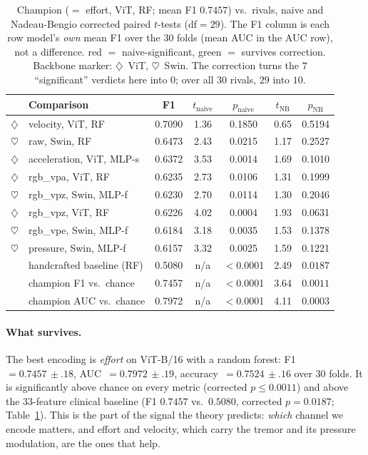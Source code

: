 \documentclass{article}
\newcommand{\gcell}{\cellcolor{goodbg}}
\newcommand{\rcell}{\cellcolor{badbg}}
\newcommand{\img}{\textcolor{vitc}{$\diamondsuit$}} %
\newcommand{\seq}{\textcolor{swinc}{$\heartsuit$}}  %
\begin{document}
\begin{table}[t]
\caption{Champion ($=$ effort, ViT, RF; mean F1 $\mathbf{0.7457}$) vs.\ rivals, naive
and Nadeau-Bengio corrected paired $t$-tests (df$=29$). The F1 column is each row
model's \emph{own} mean F1 over the $30$ folds (mean AUC in the AUC row), not a
difference. \rcell{}red $=$ naive-significant, \gcell{}green $=$ survives correction.
Backbone marker: \img~ViT, \seq~Swin. The correction turns the $7$ ``significant''
verdicts here into $0$; over all $30$ rivals, $29$ into $10$.}
\label{tab:sig}
\centering
\small
\setlength{\tabcolsep}{5.5pt}
\renewcommand{\arraystretch}{1.1}
\begin{tabular}{@{}clccccc@{}}
\toprule
 & Comparison & F1 & $t_{\text{naive}}$ & $p_{\text{naive}}$ & $t_{\text{NB}}$ & $p_{\text{NB}}$ \\
\midrule
\img & velocity, ViT, RF        & 0.7090 & 1.36 & 0.1850 & 0.65 & 0.5194 \\
\seq & raw, Swin, RF            & 0.6473 & 2.43 & \rcell 0.0215 & 1.17 & 0.2527 \\
\img & acceleration, ViT, MLP-s & 0.6372 & 3.53 & \rcell 0.0014 & 1.69 & 0.1010 \\
\img & rgb\_vpa, ViT, RF        & 0.6235 & 2.73 & \rcell 0.0106 & 1.31 & 0.1999 \\
\seq & rgb\_vpz, Swin, MLP-f    & 0.6230 & 2.70 & \rcell 0.0114 & 1.30 & 0.2046 \\
\img & rgb\_vpz, ViT, RF        & 0.6226 & 4.02 & \rcell 0.0004 & 1.93 & 0.0631 \\
\seq & rgb\_vpe, Swin, MLP-f    & 0.6184 & 3.18 & \rcell 0.0035 & 1.53 & 0.1378 \\
\seq & pressure, Swin, MLP-f    & 0.6157 & 3.32 & \rcell 0.0025 & 1.59 & 0.1221 \\
\midrule
     & handcrafted baseline (RF) & 0.5080 & n/a & $<$0.0001 & 2.49 & \gcell $\mathbf{0.0187}$ \\
     & champion F1 vs.\ chance   & 0.7457 & n/a & $<$0.0001 & 3.64 & \gcell $\mathbf{0.0011}$ \\
     & champion AUC vs.\ chance  & 0.7972 & n/a & $<$0.0001 & 4.11 & \gcell $\mathbf{0.0003}$ \\
\bottomrule
\end{tabular}
\end{table}

\paragraph{What survives.}
The best encoding is \emph{effort} on ViT-B/16 with a random forest:
F1~$=0.7457{\scriptscriptstyle\,\pm.18}$, AUC~$=0.7972{\scriptscriptstyle\,\pm.19}$,
accuracy~$=0.7524{\scriptscriptstyle\,\pm.16}$ over $30$ folds. It is significantly
above chance on every metric (corrected $p\le0.0011$) and above the $33$-feature
clinical baseline (F1 $0.7457$ vs.\ $0.5080$, corrected $p=0.0187$; Table~\ref{tab:sig}).
This is the part of the signal the theory predicts: \emph{which} channel we encode
matters, and effort and velocity, which carry the tremor and its pressure modulation,
are the ones that help.
\end{document}
